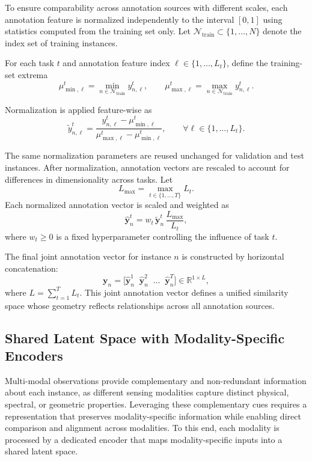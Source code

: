 \documentclass[lettersize,journal]{IEEEtran}
\begin{document}
To ensure comparability across annotation sources with different scales,
each annotation feature is normalized independently to the interval $[0,1]$
using statistics computed from the training set only.
Let $\mathcal{N}_{\mathrm{train}} \subset \{1,\dots,N\}$ denote the index set of
training instances.

For each task $t$ and annotation feature index $\ell \in \{1,\dots,L_t\}$, define the
training-set extrema
\[
\mu^{t}_{\min,\ell}
=
\min_{n \in \mathcal{N}_{\mathrm{train}}} y^{t}_{n,\ell},
\qquad
\mu^{t}_{\max,\ell}
=
\max_{n \in \mathcal{N}_{\mathrm{train}}} y^{t}_{n,\ell}.
\]

\noindent Normalization is applied feature-wise as
\begin{equation}
\tilde{y}^{t}_{n,\ell}
=
\frac{
y^{t}_{n,\ell}
-
\mu^{t}_{\min,\ell}
}{
\mu^{t}_{\max,\ell}
-
\mu^{t}_{\min,\ell}
},
\qquad
\forall \ell \in \{1,\dots,L_t\}.
\end{equation}

\noindent The same normalization parameters are reused unchanged for validation and test instances. After normalization, annotation vectors are rescaled to account for differences in dimensionality across tasks.
Let
\[
L_{\max} = \max_{t \in \{1,\dots,T\}} L_t .
\]
Each normalized annotation vector is scaled and weighted as
\begin{equation}
\hat{\mathbf{y}}^{t}_{n}
=
w_t \, \tilde{\mathbf{y}}^{t}_{n}\, \frac{L_{\max}}{L_t},
\end{equation}
where $w_t \ge 0$ is a fixed hyperparameter controlling the influence of task $t$.

The final joint annotation vector for instance $n$ is constructed by horizontal
concatenation:
\begin{equation}
\mathbf{y}_{n}
=
\big[
\hat{\mathbf{y}}^{1}_{n}
\;\;
\hat{\mathbf{y}}^{2}_{n}
\;\;
\dots
\;\;
\hat{\mathbf{y}}^{T}_{n}
\big]
\in
\mathbb{R}^{1 \times L},
\end{equation}
where $L = \sum_{t=1}^{T} L_t$.
This joint annotation vector defines a unified similarity space whose geometry
reflects relationships across all annotation sources.


\subsection{Shared Latent Space with Modality-Specific Encoders}
\label{subsec:shared-latent-space}
Multi-modal observations provide complementary and non-redundant information about each instance, as different sensing modalities capture distinct physical, spectral, or geometric properties. Leveraging these complementary cues requires a representation that preserves modality-specific information while enabling direct comparison and alignment across modalities. To this end, each modality is processed by a dedicated encoder that maps modality-specific inputs into a shared latent space.
\end{document}
